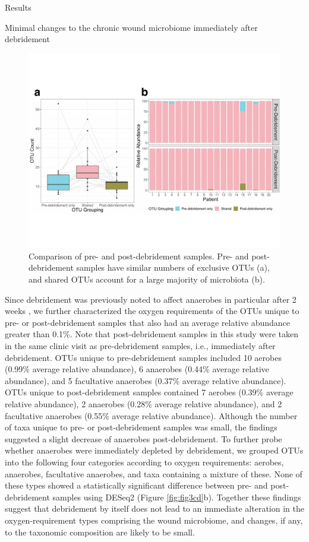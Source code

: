 \documentclass[oneside,12pt,final]{sty/ucthesis-CA2012}
\begin{document}
\begin{mainmatter}
\begin{section}{Results}
\begin{subsection}{Minimal changes to the chronic wound microbiome immediately after debridement}
\begin{figure}
\centering
\centerline{\includegraphics[width=\textwidth]{fig/C3fig3AB}}
\caption{Comparison of pre- and post-debridement samples. Pre- and post-debridement samples have similar numbers of exclusive OTUs (a), and shared OTUs account for a large majority of microbiota (b).}
\label{fig:fig3ab}
\end{figure}


Since debridement was previously noted to affect anaerobes in particular after 2 weeks \cite{RN8}, we further characterized the oxygen requirements of the OTUs unique to pre- or post-debridement samples that also had an average relative abundance greater than 0.1\%. Note that post-debridement samples in this study were taken in the same clinic visit as pre-debridement samples, i.e., immediately after debridement. OTUs unique to pre-debridement samples included 10 aerobes (0.99\% average relative abundance), 6 anaerobes (0.44\% average relative abundance), and 5 facultative anaerobes (0.37\% average relative abundance). OTUs unique to post-debridement samples contained 7 aerobes (0.39\% average relative abundance), 2 anaerobes (0.28\% average relative abundance), and 2 facultative anaerobes (0.55\% average relative abundance). Although the number of taxa unique to pre- or post-debridement samples was small, the findings suggested a slight decrease of anaerobes post-debridement. To further probe whether anaerobes were immediately depleted by debridement, we grouped OTUs into the following four categories according to oxygen requirements: aerobes, anaerobes, facultative anaerobes, and taxa containing a mixture of these. None of these types showed a statistically significant difference between pre- and post-debridement samples using DESeq2 (Figure \ref{fig:fig3cd}b). Together these findings suggest that debridement by itself does not lead to an immediate alteration in the oxygen-requirement types comprising the wound microbiome, and changes, if any, to the taxonomic composition are likely to be small. 


\end{subsection}
\end{section}
\end{mainmatter}
\end{document}
